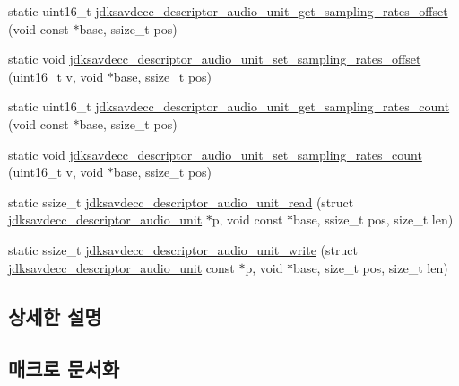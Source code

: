 \begin{DoxyCompactItemize}
\item 
static uint16\+\_\+t \hyperlink{group__descriptor__audio_ga0ac3d7ddf66d4ffd285c518e692a0221}{jdksavdecc\+\_\+descriptor\+\_\+audio\+\_\+unit\+\_\+get\+\_\+sampling\+\_\+rates\+\_\+offset} (void const $\ast$base, ssize\+\_\+t pos)
\item 
static void \hyperlink{group__descriptor__audio_gaa43383a00cc8393ab73a1599da6d8a49}{jdksavdecc\+\_\+descriptor\+\_\+audio\+\_\+unit\+\_\+set\+\_\+sampling\+\_\+rates\+\_\+offset} (uint16\+\_\+t v, void $\ast$base, ssize\+\_\+t pos)
\item 
static uint16\+\_\+t \hyperlink{group__descriptor__audio_ga5f0d312d4823a74a68b4971a8302395d}{jdksavdecc\+\_\+descriptor\+\_\+audio\+\_\+unit\+\_\+get\+\_\+sampling\+\_\+rates\+\_\+count} (void const $\ast$base, ssize\+\_\+t pos)
\item 
static void \hyperlink{group__descriptor__audio_ga27c6f1a8821f3737d07de58987227f6f}{jdksavdecc\+\_\+descriptor\+\_\+audio\+\_\+unit\+\_\+set\+\_\+sampling\+\_\+rates\+\_\+count} (uint16\+\_\+t v, void $\ast$base, ssize\+\_\+t pos)
\item 
static ssize\+\_\+t \hyperlink{group__descriptor__audio_ga5c757dc96901a63587934e89932fa2a8}{jdksavdecc\+\_\+descriptor\+\_\+audio\+\_\+unit\+\_\+read} (struct \hyperlink{structjdksavdecc__descriptor__audio__unit}{jdksavdecc\+\_\+descriptor\+\_\+audio\+\_\+unit} $\ast$p, void const $\ast$base, ssize\+\_\+t pos, size\+\_\+t len)
\item 
static ssize\+\_\+t \hyperlink{group__descriptor__audio_ga378aaf48d5f066011436e23c2bf4d455}{jdksavdecc\+\_\+descriptor\+\_\+audio\+\_\+unit\+\_\+write} (struct \hyperlink{structjdksavdecc__descriptor__audio__unit}{jdksavdecc\+\_\+descriptor\+\_\+audio\+\_\+unit} const $\ast$p, void $\ast$base, size\+\_\+t pos, size\+\_\+t len)
\end{DoxyCompactItemize}


\subsection{상세한 설명}


\subsection{매크로 문서화}
